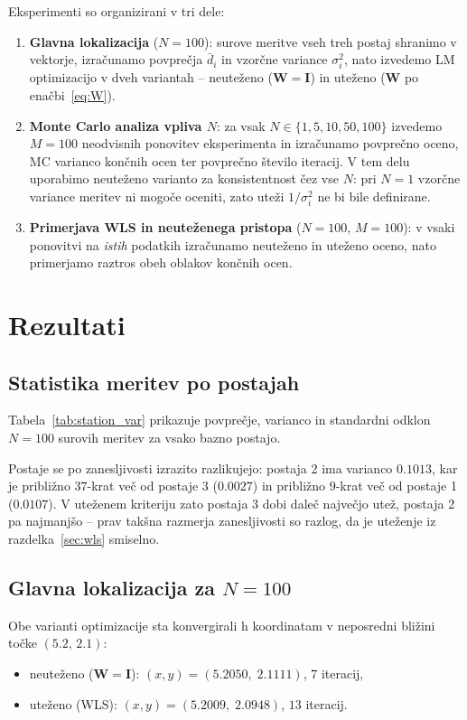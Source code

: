 \documentclass[a4paper,11pt]{article}
\begin{document}
Eksperimenti so organizirani v tri dele:
\begin{enumerate}
    \item \textbf{Glavna lokalizacija} ($N=100$): surove meritve vseh treh postaj shranimo v vektorje, izračunamo povprečja $\bar{d}_i$ in vzorčne variance $\sigma_i^2$, nato izvedemo LM optimizacijo v dveh variantah -- neuteženo ($\mathbf{W}=\mathbf{I}$) in uteženo ($\mathbf{W}$ po enačbi~\eqref{eq:W}).
    \item \textbf{Monte Carlo analiza vpliva $N$}: za vsak $N \in \{1,5,10,50,100\}$ izvedemo $M=100$ neodvisnih ponovitev eksperimenta in izračunamo povprečno oceno, MC varianco končnih ocen ter povprečno število iteracij. V tem delu uporabimo neuteženo varianto za konsistentnost čez vse $N$: pri $N=1$ vzorčne variance meritev ni mogoče oceniti, zato uteži $1/\sigma_i^2$ ne bi bile definirane.
    \item \textbf{Primerjava WLS in neuteženega pristopa} ($N=100$, $M=100$): v vsaki ponovitvi na \emph{istih} podatkih izračunamo neuteženo in uteženo oceno, nato primerjamo raztros obeh oblakov končnih ocen.
\end{enumerate}

\section{Rezultati}

\subsection{Statistika meritev po postajah}
Tabela~\ref{tab:station_var} prikazuje povprečje, varianco in standardni odklon $N=100$ surovih meritev za vsako bazno postajo.

\begin{table}[H]
\centering

\caption{Statistika meritev razdalj po baznih postajah pri $N=100$.}
\label{tab:station_var}
\end{table}

Postaje se po zanesljivosti izrazito razlikujejo: postaja 2 ima varianco $0.1013$, kar je približno $37$-krat več od postaje 3 ($0.0027$) in približno $9$-krat več od postaje 1 ($0.0107$). V uteženem kriteriju zato postaja 3 dobi daleč največjo utež, postaja 2 pa najmanjšo -- prav takšna razmerja zanesljivosti so razlog, da je uteženje iz razdelka~\ref{sec:wls} smiselno.

\subsection{Glavna lokalizacija za $N=100$}
\label{sec:rez_main}
Obe varianti optimizacije sta konvergirali h koordinatam v neposredni bližini točke $(5.2,\,2.1)$:
\begin{itemize}
    \item neuteženo ($\mathbf{W}=\mathbf{I}$): $(x,y) = (5.2050,\; 2.1111)$, $7$ iteracij,
    \item uteženo (WLS): $(x,y) = (5.2009,\; 2.0948)$, $13$ iteracij.
\end{itemize}
\end{document}
